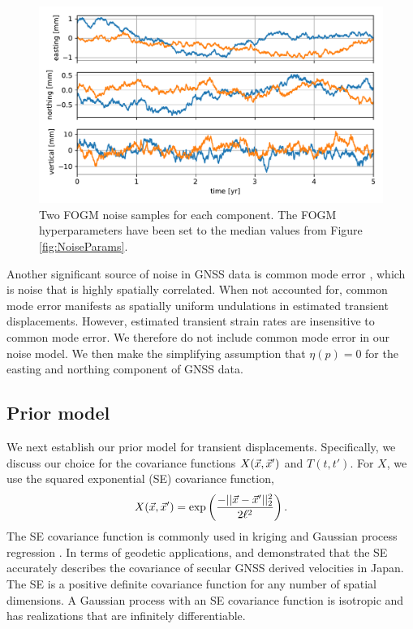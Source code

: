 \documentclass[extra,mreferee]{gji}
\begin{document}
\begin{figure}
\includegraphics{figures/noise/noise-samples.pdf}
\caption{
Two FOGM noise samples for each component. The FOGM hyperparameters
have been set to the median values from Figure \ref{fig:NoiseParams}.
}   
\label{fig:NoiseSamples}
\end{figure}

Another significant source of noise in GNSS data is common mode error
\citep[e.g.,][]{Wdowinski1997,Dong2006}, which is noise that is highly
spatially correlated. When not accounted for, common mode error
manifests as spatially uniform undulations in estimated transient
displacements. However, estimated transient strain rates are
insensitive to common mode error. We therefore do not include common
mode error in our noise model. We then make the simplifying assumption
that $\eta(p) = 0$ for the easting and northing component of GNSS
data.

\subsection{Prior model}\label{sec:SignalModel}

We next establish our prior model for transient displacements.
Specifically, we discuss our choice for the covariance functions
$X(\vec{x},\vec{x}')$ and $T(t,t')$. For $X$, we use the squared exponential
(SE) covariance function,
\begin{equation}\label{eq:SE}
X(\vec{x},\vec{x}') = \exp\left(\frac{-||\vec{x} - \vec{x}'||_2^2}{2 \ell^2}\right).
\end{equation}
The SE covariance function is commonly used in kriging
\citep[e.g,][]{Cressie1992} and Gaussian process regression
\citep[e.g.,][]{Rasmussen2006}. In terms of geodetic applications,
\citet{Kato1998} and \cite{El-Fiky1999} demonstrated that the SE
accurately describes the covariance of secular GNSS derived velocities
in Japan. The SE is a positive definite covariance function for any
number of spatial dimensions. A Gaussian process with an SE covariance
function is isotropic and has realizations that are infinitely
differentiable.
\end{document}
